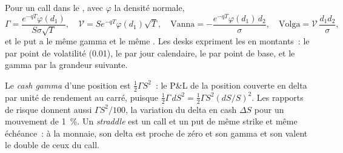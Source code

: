 Pour un call dans le , avec $\varphi$ la densité normale,
\[
\Gamma=\frac{e^{-qT}\varphi(d_1)}{S\sigma\sqrt T},\quad
\mathcal V=Se^{-qT}\varphi(d_1)\sqrt T,\quad
\mathrm{Vanna}=-\frac{e^{-qT}\varphi(d_1)\,d_2}{\sigma},\quad
\mathrm{Volga}=\mathcal V\,\frac{d_1d_2}{\sigma},
\]
et le put a le même gamma et le même . Les desks expriment les  en montants~: le  par
point de volatilité (0.01), le  par jour calendaire, le  par point de base, et le gamma
par la grandeur suivante.

\begin{definition}\label{def:dv:greeks-and-the-hedging-pnl:cashgamma}
Le \emph{cash gamma} d'une position est $\tfrac12\Gamma S^2$~: le P\&L
de la position couverte en delta par unité de rendement au carré, puisque
$\tfrac12\Gamma\,dS^2=\tfrac12\Gamma S^2(dS/S)^2$. Les rapports de risque donnent aussi
$\Gamma S^2/100$, la variation du delta en cash $\Delta S$ pour un mouvement de 1~\%. Un
\emph{straddle} est un call et un put de même strike et même échéance~:
à la monnaie, son delta est proche de zéro et son gamma et son  valent le double
de ceux du call.
\end{definition}

